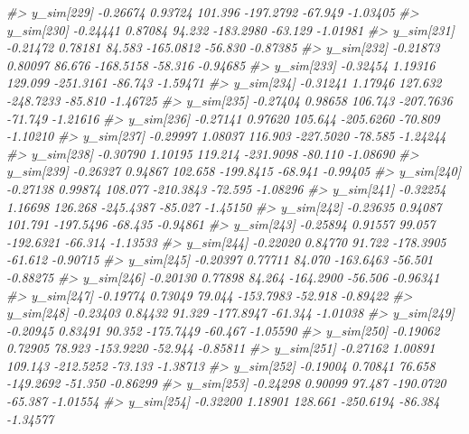 \documentclass[
  10pt,
  italian,
  a4paper,
  extrafontsizes,onecolumn,openright
  ]{memoir}
\newenvironment{Shaded}{\begin{snugshade}}{\end{snugshade}}
\newcommand{\CommentTok}[1]{\textcolor[rgb]{0.56,0.35,0.01}{\textit{#1}}}
\begin{document}
\begin{Shaded}
\begin{Highlighting}[]
\CommentTok{\#\textgreater{} y\_sim[229] {-}0.26674 0.93724 101.396 {-}197.2792 {-}67.949 {-}1.03405}
\CommentTok{\#\textgreater{} y\_sim[230] {-}0.24441 0.87084  94.232 {-}183.2980 {-}63.129 {-}1.01981}
\CommentTok{\#\textgreater{} y\_sim[231] {-}0.21472 0.78181  84.583 {-}165.0812 {-}56.830 {-}0.87385}
\CommentTok{\#\textgreater{} y\_sim[232] {-}0.21873 0.80097  86.676 {-}168.5158 {-}58.316 {-}0.94685}
\CommentTok{\#\textgreater{} y\_sim[233] {-}0.32454 1.19316 129.099 {-}251.3161 {-}86.743 {-}1.59471}
\CommentTok{\#\textgreater{} y\_sim[234] {-}0.31241 1.17946 127.632 {-}248.7233 {-}85.810 {-}1.46725}
\CommentTok{\#\textgreater{} y\_sim[235] {-}0.27404 0.98658 106.743 {-}207.7636 {-}71.749 {-}1.21616}
\CommentTok{\#\textgreater{} y\_sim[236] {-}0.27141 0.97620 105.644 {-}205.6260 {-}70.809 {-}1.10210}
\CommentTok{\#\textgreater{} y\_sim[237] {-}0.29997 1.08037 116.903 {-}227.5020 {-}78.585 {-}1.24244}
\CommentTok{\#\textgreater{} y\_sim[238] {-}0.30790 1.10195 119.214 {-}231.9098 {-}80.110 {-}1.08690}
\CommentTok{\#\textgreater{} y\_sim[239] {-}0.26327 0.94867 102.658 {-}199.8415 {-}68.941 {-}0.99405}
\CommentTok{\#\textgreater{} y\_sim[240] {-}0.27138 0.99874 108.077 {-}210.3843 {-}72.595 {-}1.08296}
\CommentTok{\#\textgreater{} y\_sim[241] {-}0.32254 1.16698 126.268 {-}245.4387 {-}85.027 {-}1.45150}
\CommentTok{\#\textgreater{} y\_sim[242] {-}0.23635 0.94087 101.791 {-}197.5496 {-}68.435 {-}0.94861}
\CommentTok{\#\textgreater{} y\_sim[243] {-}0.25894 0.91557  99.057 {-}192.6321 {-}66.314 {-}1.13533}
\CommentTok{\#\textgreater{} y\_sim[244] {-}0.22020 0.84770  91.722 {-}178.3905 {-}61.612 {-}0.90715}
\CommentTok{\#\textgreater{} y\_sim[245] {-}0.20397 0.77711  84.070 {-}163.6463 {-}56.501 {-}0.88275}
\CommentTok{\#\textgreater{} y\_sim[246] {-}0.20130 0.77898  84.264 {-}164.2900 {-}56.506 {-}0.96341}
\CommentTok{\#\textgreater{} y\_sim[247] {-}0.19774 0.73049  79.044 {-}153.7983 {-}52.918 {-}0.89422}
\CommentTok{\#\textgreater{} y\_sim[248] {-}0.23403 0.84432  91.329 {-}177.8947 {-}61.344 {-}1.01038}
\CommentTok{\#\textgreater{} y\_sim[249] {-}0.20945 0.83491  90.352 {-}175.7449 {-}60.467 {-}1.05590}
\CommentTok{\#\textgreater{} y\_sim[250] {-}0.19062 0.72905  78.923 {-}153.9220 {-}52.944 {-}0.85811}
\CommentTok{\#\textgreater{} y\_sim[251] {-}0.27162 1.00891 109.143 {-}212.5252 {-}73.133 {-}1.38713}
\CommentTok{\#\textgreater{} y\_sim[252] {-}0.19004 0.70841  76.658 {-}149.2692 {-}51.350 {-}0.86299}
\CommentTok{\#\textgreater{} y\_sim[253] {-}0.24298 0.90099  97.487 {-}190.0720 {-}65.387 {-}1.01554}
\CommentTok{\#\textgreater{} y\_sim[254] {-}0.32200 1.18901 128.661 {-}250.6194 {-}86.384 {-}1.34577}

\end{Highlighting}
\end{Shaded}
\end{document}
